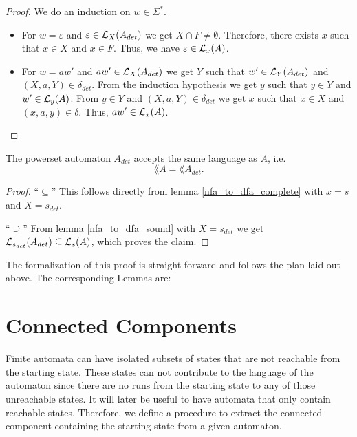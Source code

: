 \begin{proof}
    We do an induction on $w \in \Sigma^*$. %
    \begin{itemize}
        \item
            For $w = \varepsilon$ and $\varepsilon \in \mathcal{L}_{X}(A_{det})$ we get  $X \cap F \neq \emptyset$.
            Therefore, there exists $x$ such that $x \in X$ and $x \in F$.
            Thus, we have $\varepsilon \in \mathcal{L}_{x}(A)$.
        \item
            For $w = a w'$ and $a w' \in \mathcal{L}_{X}(A_{det})$ we get $Y$ such that $w' \in \mathcal{L}_{Y}(A_{det})$ and $(X,a,Y) \in \delta_{det}$.
            From the induction hypothesis we get $y$ such that $y \in Y$ and $w' \in \mathcal{L}_{y}(A)$.
            From $y \in Y$ and $(X, a, Y) \in \delta_{det}$ we get $x$ such that $x \in X$ and $(x, a, y) \in \delta$.
            Thus, $a w' \in \mathcal{L}_{x}(A)$.
    \end{itemize}
\end{proof}

\begin{theorem}
    The powerset automaton $A_{det}$ accepts the same language as $A$, i.e.
    \begin{equation*}        
        \lang{A} = \lang{A_{det}}.        
    \end{equation*}
\end{theorem}
\begin{proof}
    ``$\subseteq$'' 
    This follows directly from lemma \ref{nfa_to_dfa_complete} with $x = s$ and $X = {s}_{det}$.

    ``$\supseteq$''
    From lemma \ref{nfa_to_dfa_sound} with $X = {s}_{det}$ we get 
    $\mathcal{L}_{s_{det}}(A_{det}) \subseteq \mathcal{L}_{s}(A)$, which proves the claim.
\end{proof}


The formalization of this proof is straight-forward and follows the plan laid out above. 
The corresponding Lemmas are:


\section{Connected Components}
 
Finite automata can have isolated subsets of states that are not reachable from the starting state. 
These states can not contribute to the language of the automaton since there are no runs from the starting state to any of those unreachable states.
It will later be useful to have automata that only contain reachable states. 
Therefore, we define a procedure to extract the connected component containing the starting state from a given automaton.

